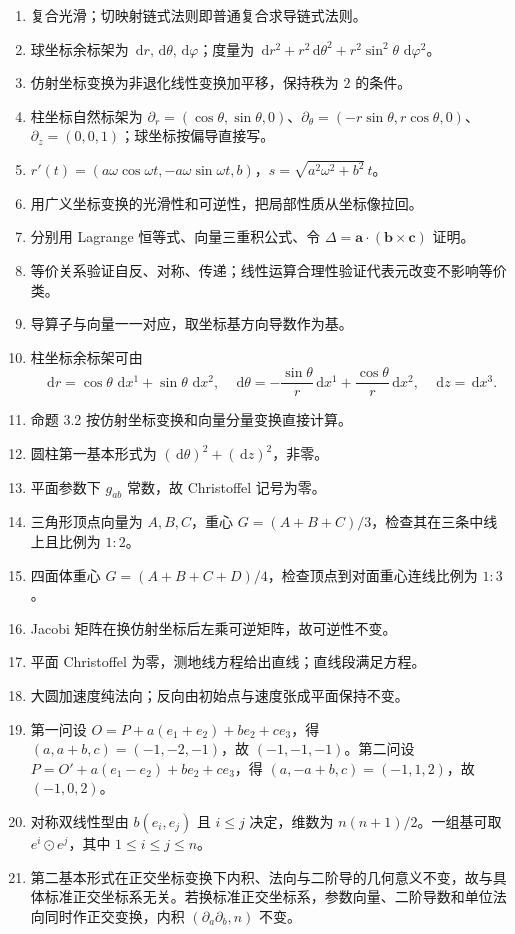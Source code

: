 \documentclass[UTF8,12pt,a4paper]{ctexart}
\newcommand{\dd}{\,\mathrm d}
\newcommand{\vct}[1]{\boldsymbol{#1}}
\begin{document}
\begin{enumerate}
\item 复合光滑；切映射链式法则即普通复合求导链式法则。
\item 球坐标余标架为 $\dd r,\dd\theta,\dd\varphi$；度量为 $\dd r^2+r^2\dd\theta^2+r^2\sin^2\theta\,\dd\varphi^2$。
\item 仿射坐标变换为非退化线性变换加平移，保持秩为 $2$ 的条件。
\item 柱坐标自然标架为 $\partial_r=(\cos\theta,\sin\theta,0)$、$\partial_\theta=(-r\sin\theta,r\cos\theta,0)$、$\partial_z=(0,0,1)$；球坐标按偏导直接写。
\item $r'(t)=(a\omega\cos\omega t,-a\omega\sin\omega t,b)$，$s=\sqrt{a^2\omega^2+b^2}\,t$。
\item 用广义坐标变换的光滑性和可逆性，把局部性质从坐标像拉回。
\item 分别用 Lagrange 恒等式、向量三重积公式、令 $\Delta=\vct a\cdot(\vct b\times\vct c)$ 证明。
\item 等价关系验证自反、对称、传递；线性运算合理性验证代表元改变不影响等价类。
\item 导算子与向量一一对应，取坐标基方向导数作为基。
\item 柱坐标余标架可由
\[
\dd r=\cos\theta\,\dd x^1+\sin\theta\,\dd x^2,\quad
\dd\theta=-\frac{\sin\theta}{r}\dd x^1+\frac{\cos\theta}{r}\dd x^2,\quad
\dd z=\dd x^3.
\]
\item 命题 3.2 按仿射坐标变换和向量分量变换直接计算。
\item 圆柱第一基本形式为 $(\dd\theta)^2+(\dd z)^2$，非零。
\item 平面参数下 $g_{ab}$ 常数，故 Christoffel 记号为零。
\item 三角形顶点向量为 $A,B,C$，重心 $G=(A+B+C)/3$，检查其在三条中线上且比例为 $1:2$。
\item 四面体重心 $G=(A+B+C+D)/4$，检查顶点到对面重心连线比例为 $1:3$。
\item Jacobi 矩阵在换仿射坐标后左乘可逆矩阵，故可逆性不变。
\item 平面 Christoffel 为零，测地线方程给出直线；直线段满足方程。
\item 大圆加速度纯法向；反向由初始点与速度张成平面保持不变。
\item 第一问设 $O=P+a(e_1+e_2)+be_2+ce_3$，得 $(a,a+b,c)=(-1,-2,-1)$，故 $(-1,-1,-1)$。第二问设 $P=O'+a(e_1-e_2)+be_2+ce_3$，得 $(a,-a+b,c) = (-1,1,2)$，故 $(-1,0,2)$。
\item 对称双线性型由 $b(e_i,e_j)$ 且 $i\le j$ 决定，维数为 $n(n+1)/2$。一组基可取 $e^i\odot e^j$，其中 $1\le i\le j\le n$。
\item 第二基本形式在正交坐标变换下内积、法向与二阶导的几何意义不变，故与具体标准正交坐标系无关。若换标准正交坐标系，参数向量、二阶导数和单位法向同时作正交变换，内积 $(\partial_a\partial_b,n)$ 不变。
\end{enumerate}
\end{document}

